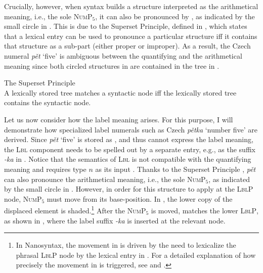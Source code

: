 \documentclass[output=paper]{langscibook}
\begin{document}
Crucially, however, when syntax builds a structure interpreted as the arithmetical meaning, i.e., the sole \textsc{NumP}$_5$, it can also be pronounced by , as indicated by the small circle in . This is due to the Superset Principle, defined in  \citep{starke2009nanosyntax}, which states that a lexical entry can be used to pronounce a particular structure iff it contains that structure as a sub-part (either proper or improper). As a result, the Czech numeral \textit{pět} `five' is ambiguous between the quantifying and the arithmetical meaning since both circled structures in  are contained in the tree in .

\ea The Superset Principle \citep{starke2009nanosyntax}\\
A lexically stored tree matches a syntactic node iff the lexically stored tree contains the syntactic node.\label{def:superset}
\z

\noindent Let us now consider how the label meaning arises. For this purpose, I will demonstrate how specialized label numerals such as Czech \textit{pětka} `number five' are derived. Since \textit{pět} `five' is stored as , and thus cannot express the label meaning, the \textsc{Lbl} component needs to be spelled out by a separate entry, e.g., as the suffix \textit{-ka} in . Notice that the semantics of \textsc{Lbl} is not compatible with the quantifying meaning and requires type $n$ as its input . Thanks to the Superset Principle , \textit{pět} can also pronounce the arithmetical meaning, i.e., the sole \textsc{NumP}$_5$, as indicated by the small circle in . However, in order for this structure to apply at the \textsc{LblP} node, \textsc{NumP}$_5$ must move from its base-position. In , the lower copy of the displaced element is shaded.\footnote{In Nanosyntax, the movement in  is driven by the need to lexicalize the phrasal \textsc{LblP} node by
the lexical entry in . For a detailed explanation of how precisely the movement in  is triggered, see \citet{baunaz_lander2018nanosyntax} and \citet{caha_et-al2019fine}.} After the \textsc{NumP}$_5$ is moved,  matches the lower \textsc{LblP}, as shown in , where the label suffix \textit{-ka} is inserted at the relevant node.
\end{document}
